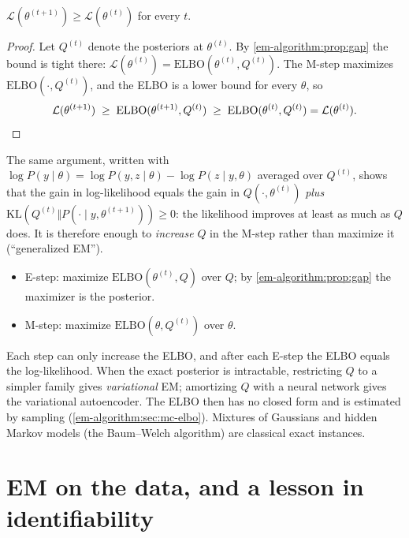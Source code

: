 \begin{notechapter}
\begin{theorem}[Monotonicity of EM]\label{em-algorithm:thm:monotone}
$\mathcal L(\theta^{(t+1)})\geq\mathcal L(\theta^{(t)})$ for every $t$.
\end{theorem}

\begin{proof}
Let $Q^{(t)}$ denote the posteriors at $\theta^{(t)}$. By
\cref{em-algorithm:prop:gap} the bound is tight there:
$\mathcal L(\theta^{(t)}) = \mathrm{ELBO}(\theta^{(t)}, Q^{(t)})$. The M-step maximizes
$\mathrm{ELBO}(\cdot, Q^{(t)})$, and the ELBO is a lower bound for every $\theta$, so
\[
  \mathcal L(\theta^{(t+1)})\;\geq\;\mathrm{ELBO}(\theta^{(t+1)}, Q^{(t)})
  \;\geq\;\mathrm{ELBO}(\theta^{(t)}, Q^{(t)}) = \mathcal L(\theta^{(t)}). \qedhere
\]
\end{proof}

The same argument, written with $\log P(y\mid\theta) = \log P(y,z\mid\theta) - \log P(z\mid y,\theta)$
averaged over $Q^{(t)}$, shows that the gain in log-likelihood equals the gain in
$Q(\cdot,\theta^{(t)})$ \emph{plus} $\mathrm{KL}(Q^{(t)}\Vert P(\cdot\mid y,\theta^{(t+1)}))\geq0$:
the likelihood improves at least as much as $Q$ does. It is therefore enough to
\emph{increase} $Q$ in the M-step rather than maximize it (``generalized EM'').

\begin{keyidea}
\begin{itemize}[nosep]
  \item E-step: maximize $\mathrm{ELBO}(\theta^{(t)}, Q)$ over $Q$; by
        \cref{em-algorithm:prop:gap} the maximizer is the posterior.
  \item M-step: maximize $\mathrm{ELBO}(\theta, Q^{(t)})$ over $\theta$.
\end{itemize}
Each step can only increase the ELBO, and after each E-step the ELBO equals the
log-likelihood. When the exact posterior is intractable, restricting $Q$ to a
simpler family gives \emph{variational} EM; amortizing $Q$ with a neural network
gives the variational autoencoder. The ELBO then has no closed form and is
estimated by sampling (\cref{em-algorithm:sec:mc-elbo}). Mixtures of Gaussians and hidden Markov models
(the Baum--Welch algorithm) are classical exact instances.
\end{keyidea}

\section{EM on the data, and a lesson in identifiability}\label{em-algorithm:sec:numbers}


\end{notechapter}
